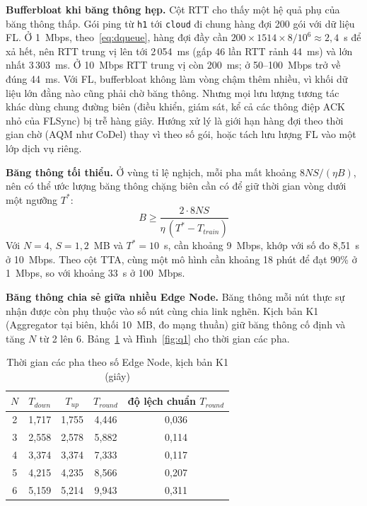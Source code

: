 \textbf{Bufferbloat khi băng thông hẹp.} Cột RTT cho thấy một hệ quả phụ của băng thông thấp. Gói ping từ \texttt{h1} tới \texttt{cloud} đi chung hàng đợi 200 gói với dữ liệu FL. Ở 1~Mbps, theo~\eqref{eq:dqueue}, hàng đợi đầy cần $200 \times 1514 \times 8 / 10^6 \approx 2{,}4$~s để xả hết, nên RTT trung vị lên tới 2\,054~ms (gấp 46 lần RTT rảnh 44~ms) và lớn nhất 3\,303~ms. Ở 10~Mbps RTT trung vị còn 200~ms; ở 50--100~Mbps trở về đúng 44~ms. Với FL, bufferbloat không làm vòng chậm thêm nhiều, vì khối dữ liệu lớn đằng nào cũng phải chờ băng thông. Nhưng mọi lưu lượng tương tác khác dùng chung đường biên (điều khiển, giám sát, kể cả các thông điệp ACK nhỏ của FLSync) bị trễ hàng giây. Hướng xử lý là giới hạn hàng đợi theo thời gian chờ (AQM như CoDel) thay vì theo số gói, hoặc tách lưu lượng FL vào một lớp dịch vụ riêng.

\textbf{Băng thông tối thiểu.} Ở vùng tỉ lệ nghịch, mỗi pha mất khoảng $8NS/(\eta B)$, nên có thể ước lượng băng thông chặng biên cần có để giữ thời gian vòng dưới một ngưỡng $T^{*}$:
\begin{equation}
    B \geq \frac{2 \cdot 8 N S}{\eta\,(T^{*} - T_{train})}
    \label{eq:bmin}
\end{equation}
Với $N = 4$, $S = 1{,}2$~MB và $T^{*} = 10$~s, cần khoảng 9~Mbps, khớp với số đo 8{,}51~s ở 10~Mbps. Theo cột TTA, cùng một mô hình cần khoảng 18 phút để đạt 90\% ở 1~Mbps, so với khoảng 33~s ở 100~Mbps.

\textbf{Băng thông chia sẻ giữa nhiều Edge Node.} Băng thông mỗi nút thực sự nhận được còn phụ thuộc vào số nút cùng chia link nghẽn. Kịch bản K1 (Aggregator tại biên, khối 10~MB, đo mạng thuần) giữ băng thông cố định và tăng $N$ từ 2 lên 6. Bảng~\ref{tab:q1} và Hình~\ref{fig:q1} cho thời gian các pha.

\begin{table}[H]
    \centering
    \caption{Thời gian các pha theo số Edge Node, kịch bản K1 (giây)}
    \label{tab:q1}
    \begin{tabular}{c c c c c}
        \toprule
        $N$ & $T_{down}$ & $T_{up}$ & $T_{round}$ & độ lệch chuẩn $T_{round}$ \\
        \midrule
        2 & 1,717 & 1,755 & 4,446 & 0,036 \\
        3 & 2,558 & 2,578 & 5,882 & 0,114 \\
        4 & 3,374 & 3,374 & 7,333 & 0,117 \\
        5 & 4,215 & 4,235 & 8,566 & 0,207 \\
        6 & 5,159 & 5,214 & 9,943 & 0,311 \\
        \bottomrule
    \end{tabular}
\end{table}

